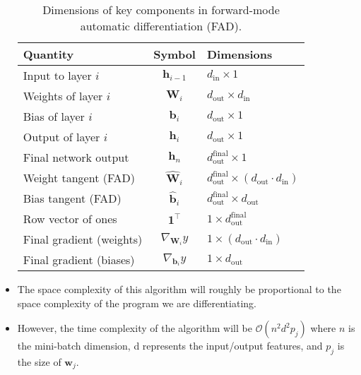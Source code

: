 \documentclass{article}
\newcommand{\mbf}[1]{\mathbf{#1}}
\begin{document}
\begin{itemize}
\begin{itemize}
\end{itemize}

\begin{table}[H]
\caption{Dimensions of key components in forward-mode automatic differentiation (FAD).}
\centering
\renewcommand{\arraystretch}{1.3}
\begin{tabular}{l c l}
\textbf{Quantity} & \textbf{Symbol} & \textbf{Dimensions} \\
\hline
Input to layer $i$        & $\mathbf{h}_{i-1}$            & $d_{\text{in}} \times 1$ \\
Weights of layer $i$      & $\mathbf{W}_i$                & $d_{\text{out}} \times d_{\text{in}}$ \\
Bias of layer $i$         & $\mathbf{b}_i$                & $d_{\text{out}} \times 1$ \\
Output of layer $i$       & $\mathbf{h}_i$                & $d_{\text{out}} \times 1$ \\
Final network output      & $\mathbf{h}_n$                & $d_{\text{out}}^{\text{final}} \times 1$ \\
\hline
Weight tangent (FAD)      & $\widehat{\mathbf{W}}_i$      & $d_{\text{out}}^{\text{final}} \times (d_{\text{out}} \cdot d_{\text{in}})$ \\
Bias tangent (FAD)        & $\widehat{\mathbf{b}}_i$      & $d_{\text{out}}^{\text{final}} \times d_{\text{out}}$ \\
Row vector of ones        & $\mathbf{1}^\top$             & $1 \times d_{\text{out}}^{\text{final}}$ \\
Final gradient (weights)  & $\nabla_{\mathbf{W}_i} y$     & $1 \times (d_{\text{out}} \cdot d_{\text{in}})$ \\
Final gradient (biases)   & $\nabla_{\mathbf{b}_i} y$     & $1 \times d_{\text{out}}$ \\
\end{tabular}
\end{table}
\item The space complexity of this algorithm will roughly be proportional to the space complexity of the program we are differentiating.
\item However, the time complexity of the algorithm will be $\mathcal{O}(n^2d^2p_j)$ where $n$ is the mini-batch dimension, d represents the input/output features, and $p_j$ is the size of $\mbf{w}_j$.
\end{itemize}
\end{document}
